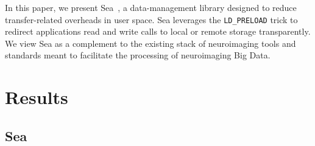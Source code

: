 \documentclass[fleqn,10pt]{wlscirep}
\begin{document}
    In this paper, we present Sea~\cite{hayot2022sea}, a data-management library designed to reduce
    transfer-related overheads in user space. Sea leverages the \texttt{LD\_PRELOAD} trick to redirect applications read and write calls to 
    local or remote storage transparently. We view Sea as a complement
    to the existing stack of neuroimaging tools and standards meant to facilitate 
    the processing of neuroimaging Big Data.   
    
    
    
    
    
    \section{Results}

    \subsection{Sea}
    
\end{document}
